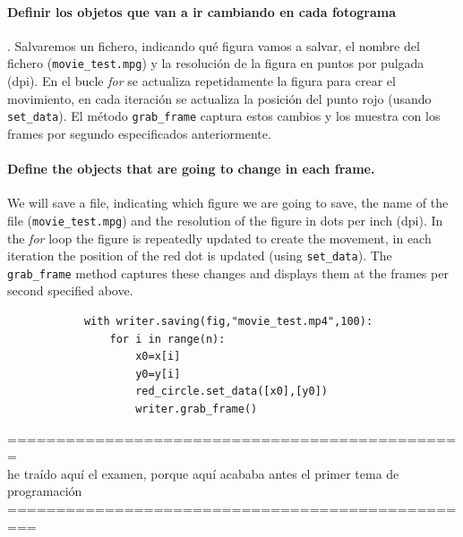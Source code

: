 \begin{paracol}{2}
    \paragraph{Definir los objetos que van a ir cambiando en cada fotograma}. Salvaremos un fichero, indicando qué figura vamos a salvar, el nombre del fichero (\texttt{movie\_test.mpg}) y la resolución de la figura en puntos por pulgada (dpi). En el bucle \textit{for} se actualiza repetidamente la figura para crear el movimiento, en cada iteración se actualiza la posición del punto rojo (usando \texttt{set\_data}). El método \texttt{grab\_frame} captura estos cambios y los muestra con los frames por segundo especificados anteriormente.
      \switchcolumn
      \paragraph{Define the objects that are going to change in each frame.} We will save a file, indicating which figure we are going to save, the name of the file (\texttt{movie\_test.mpg}) and the resolution of the figure in dots per inch (dpi). In the \textit{for} loop the figure is repeatedly updated to create the movement, in each iteration the position of the red dot is updated (using \texttt{set\_data}). The \texttt{grab\_frame} method captures these changes and displays them at the frames per second specified above.
\end{paracol}
      \begin{verbatim}
            with writer.saving(fig,"movie_test.mp4",100):
                for i in range(n):
                    x0=x[i]
                    y0=y[i]
                    red_circle.set_data([x0],[y0])
                    writer.grab_frame()
        \end{verbatim}
        
\newpage
===============================================\\
he traído aquí el examen, porque aquí acababa antes el primer tema de programación\\
=================================================
